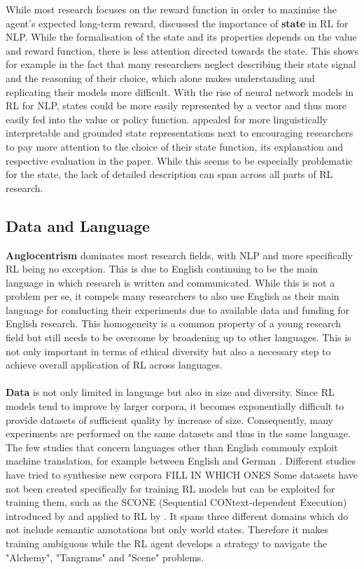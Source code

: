 \documentclass[11pt,a4paper]{article}
\begin{document}
While most research focuses on the reward function in order to maximise the agent's expected long-term reward, \citet{madureira2020} discussed the importance of \textbf{state} in RL for NLP. While the formalisation of the state and its properties depends on the value and reward function, there is less attention directed towards the state. This shows for example in the fact that many researchers neglect describing their state signal and the reasoning of their choice, which alone makes understanding and replicating their models more difficult. With the rise of neural network models in RL for NLP, states could be more easily represented by a vector and thus more easily fed into the value or policy function. \citet{madureira2020} appealed for more linguistically interpretable and grounded state representations next to encouraging researchers to pay more attention to the choice of their state function, its explanation and respective evaluation in the paper. While this seems to be especially problematic for the state, the lack of detailed description can span across all parts of RL research.

\subsection{Data and Language}
\textbf{Anglocentrism} dominates most research fields, with NLP and more specifically RL being no exception. This is due to English continuing to be the main language in which research is written and communicated. While this is not a problem per se, it compels many researchers to also use English as their main language for conducting their experiments due to available data and funding for English research. This homogeneity is a common property of a young research field but still needs to be overcome by broadening up to other languages. This is not only important in terms of ethical diversity but also a necessary step to achieve overall application of RL across languages. \\\\
\textbf{Data} is not only limited in language but also in size and diversity. Since RL models tend to improve by larger corpora, it becomes exponentially difficult to provide datasets of sufficient quality by increase of size. Consequently, many experiments are performed on the same datasets and thus in the same language. The few studies that concern languages other than English commonly exploit machine translation, for example between English and German \citet{yasui-etal-2019}. Different studies have tried to synthesise new corpora FILL IN WHICH ONES
Some datasets have not been created specifically for training RL models but can be exploited for training them, such as the SCONE (Sequential CONtext-dependent Execution) introduced by \citet{long-2016} and applied to RL by \cite{guu-etal-2017-language}. It spans three different domains which do not include semantic annotations but only world states. Therefore it makes training ambiguous while the RL agent develops a strategy to navigate the "Alchemy", "Tangrams" and "Scene" problems.
\end{document}
